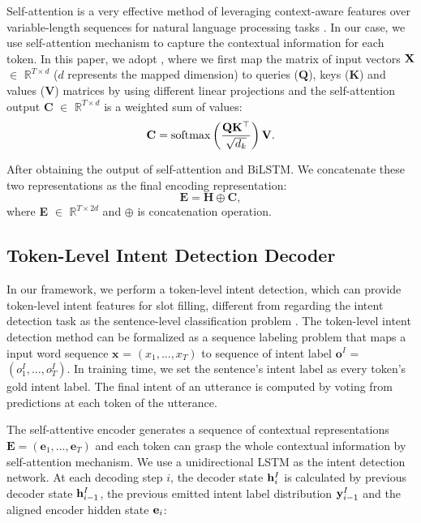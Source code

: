 \documentclass[11pt,a4paper]{article}
\begin{document}
Self-attention is a very effective 
method of leveraging context-aware features over 
variable-length sequences for natural language 
processing tasks \cite{tan2018deep,P18-1135}. 
In our case, we use  self-attention mechanism to capture 
the contextual information for each token.
In this paper, we adopt \citet{NIPS2017_7181}, where
we first map the matrix of input vectors $\bf{X}$ $\in$ $\mathbb{R}^{T\times d}$ 
($d$ represents the 
mapped dimension) to queries (${\mathbf{Q}}$), keys (${\mathbf K}$) and values 
(${\mathbf V}$) matrices by using different linear projections
and the self-attention output 
{\bf{C}} $\in$ $\mathbb{R}^{T\times d}$  is a weighted sum of values:
\begin{equation}
{\bf{C}} = \operatorname { softmax } \left( \frac { \mathbf Q \mathbf K^\top } { \sqrt { d _ { k } } } \right) \mathbf V.
\end{equation}

After obtaining the output of self-attention and 
BiLSTM. We concatenate these two representations as 
the final encoding representation:
\begin{equation}
\mathbf{ E} =\mathbf{ H } \oplus\mathbf{C},
\end{equation}
where {\bf{E}} $\in$ $\mathbb{R}^{T\times 2d}$ and $\oplus$ is concatenation operation.


\subsection{Token-Level Intent Detection Decoder}

In our framework, we perform a token-level intent detection, which can provide 
token-level intent features for slot filling, different from regarding 
the intent detection task as the sentence-level classification problem 
\cite{liu2016attention}.
The token-level intent detection method can be formalized as a sequence labeling problem that
maps a input word sequence $\mathbf{ x}$ = $(x_{1} ,...,x_{T} )$ to
sequence of intent label $\mathbf{o}^{I}$ = $(o_{1}^{I} , ... , o_{T}^{I})$. 
In training time, we set the sentence's intent label as every token's gold intent label.
The final intent of an utterance is computed by voting from predictions 
at each token of the utterance.

The self-attentive encoder generates a 
sequence of contextual representations $\mathbf{E}= (\mathbf{e}_{1},...,\mathbf{e}_T)$ and each 
token can grasp the whole contextual information by self-attention mechanism. We use a unidirectional LSTM as the intent detection network. 
At each decoding step $i$, the decoder state ${\bf{h}}_{i}^{I}$ is 
calculated by previous decoder state ${\bf{h}}_{i-1}^{I}$, the previous 
emitted intent label distribution ${\bf{y}}_{i-1}^{I}$ 
and the aligned encoder hidden state ${\bf{e}}_{i}$:
\end{document}

